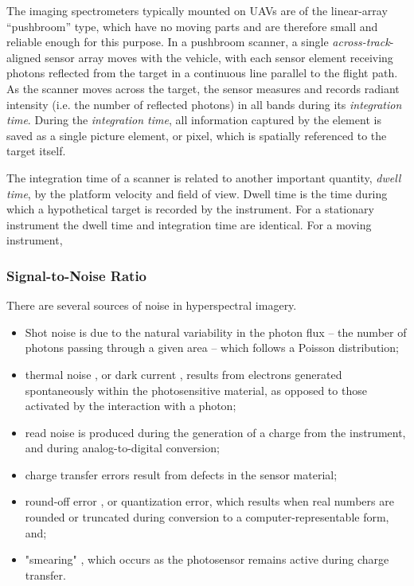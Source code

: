 The imaging spectrometers typically mounted on UAVs are of the linear-array ``pushbroom'' type, which have no moving parts and are therefore small and reliable enough for this purpose. In a pushbroom scanner, a single \emph{across-track}-aligned sensor array moves with the vehicle, with each sensor element receiving photons reflected from the target in a continuous line parallel to the flight path. As the scanner moves across the target, the sensor measures and records radiant intensity (i.e. the number of reflected photons) in all bands during its \emph{integration time}. During the \emph{integration time}, all information captured by the element is saved as a single picture element, or pixel, which is spatially referenced to the target itself. 

The integration time of a scanner is related to another important quantity, \emph{dwell time}, by the platform velocity and field of view. Dwell time is the time during which a hypothetical target is recorded by the instrument. For a stationary instrument the dwell time and integration time are identical. For a moving instrument, 

\subsubsection{Signal-to-Noise Ratio}

There are several sources of noise in hyperspectral imagery. 

\begin{itemize}
\item Shot noise \cite{Barducci2007} is due to the natural variability in the photon flux -- the number of photons passing through a given area -- which follows a Poisson distribution;
\item thermal noise \cite{Barducci2007}, or dark current \cite{Rogass2011}, results from electrons generated spontaneously within the photosensitive material, as opposed to those activated by the interaction with a photon;
\item read noise \cite{Barducci2007} is produced during the generation of a charge from the instrument, and during analog-to-digital conversion;
\item charge transfer errors \cite{Barducci2007} result from defects in the sensor material;
\item round-off error \cite{Barducci2007}, or quantization error, which results when real numbers are rounded or truncated during conversion to a computer-representable form, and;
\item "smearing" \cite{Barducci2007,Ruyten1999}, which occurs as the photosensor remains active during charge transfer.
\end{itemize}

